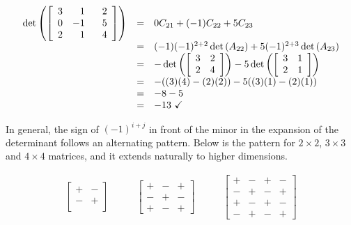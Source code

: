 \documentclass{ximera}
\begin{document}
\[ \begin{array}{rcl} 

\det \left( \left[ \begin{array}{rrr} 3 & 1 & \hphantom{-}2 \\ 0 & -1 & 5 \\ 2 & 1 & 4 \\ \end{array} \right] \right)& = & 0C_{21} + (-1)C_{22}+5C_{23} \\

& = &  (-1) (-1)^{2+2} \det\left(A_{22}\right) + 5 (-1)^{2+3}\det\left(A_{23}\right) \\ 
        
        & = & - \det \left( \left[ \begin{array}{rr} 3 & 2 \\ 2 & 4 \\ \end{array} \right] \right) -5 \det \left( \left[ \begin{array}{rr} 3 & 1 \\ 2 & 1 \\ \end{array} \right] \right) \\ 
        & = & -((3)(4)-(2)(2)) - 5((3)(1)-(2)(1)) \\
        & = & -8-5 \\
        & = & -13 \, \, \checkmark \\ \end{array}  \]

In general, the sign of $(-1)^{i+j}$ in front of the minor in the expansion of the determinant follows an alternating pattern. Below is the pattern for $2 \times 2$, $3 \times 3$ and $4 \times 4$ matrices, and it extends naturally to higher dimensions.  

\[ \begin{array}{ccc}

\left[ \begin{array}{cc} + & - \\ - & + \\ \end{array} \right] 

&
\qquad 

\left[ \begin{array}{ccc} + & - & + \\ - & + & - \\ + & - & +  \end{array} \right] 


&

\qquad

\left[ \begin{array}{cccc} + & - & + & - \\ - & + & - & +\\ + & - & + & - \\ - & + & - & + \end{array} \right] 

\end{array} \]
\end{document}
